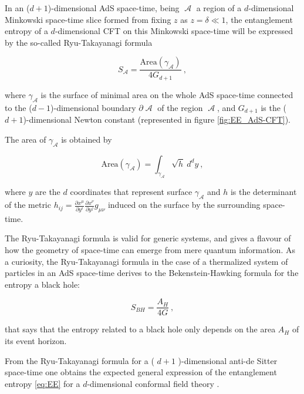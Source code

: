 \documentclass[lettersize,journal]{IEEEtran}
\providecommand{\eq}[2]{
    \begin{equation}
        #2
    \label{eq:#1}
    \end{equation}
}
\DeclareMathOperator{\calA}{\mathcal{A}}
\begin{document}


In an ($d+1$)-dimensional AdS space-time, being $\calA$ a region of a $d$-dimensional Minkowski space-time slice formed from fixing $z$ as $z=\delta \ll 1$, the entanglement entropy of a $d$-dimensional CFT on this Minkowski space-time will be expressed by the so-called Ryu-Takayanagi formula
\eq{EE_RT}{
    S_{\calA} = \frac{ \text{Area}(\gamma_{\calA}) }{ 4 G_{d+1} } \ ,
}
\cite{ryu_holographic_2008} where $\gamma_{\calA}$ is the surface of minimal area on the whole AdS space-time connected to the ($d-1$)-dimensional boundary $\partial \calA$ of the region $\calA$, and $G_{d+1}$ is the ($d+1$)-dimensional Newton constant (represented in figure \ref{fig:EE_AdS-CFT}).

The area of $\gamma_{\calA}$ is obtained by
\eq{EE_RT-area}{
    \text{Area}(\gamma_{\calA}) = \int_{\gamma_{\calA}} \sqrt{h} \ d^{d}y \ ,
}
where $y$ are the $d$ coordinates that represent surface $\gamma_{\calA}$ and $h$ is the determinant of the metric $h_{ij} = \frac{\partial x^\mu}{\partial y^i} \frac{\partial x^\nu}{\partial y^j} g_{\mu\nu}$ induced on the surface by the surrounding space-time.

The Ryu-Takayanagi formula is valid for generic systems, and gives a flavour of how the geometry of space-time can emerge from mere quantum information. As a curiosity, the Ryu-Takayanagi formula in the case of a thermalized system of particles in an AdS space-time derives to the Bekenstein-Hawking formula \cite{bekenstein_black_1973} for the entropy a black hole:
\eq{BH}{
    S_{BH} = \frac{ A_H }{ 4 G } \ ,
}
that says that the entropy related to a black hole only depends on the area $A_H$ of its event horizon.

From the Ryu-Takayanagi formula for a ( $d+1$ )-dimensional anti-de Sitter space-time one obtains the expected general expression of the entanglement entropy \ref{eq:EE} for a $d$-dimensional conformal field theory \cite{}.
\end{document}
